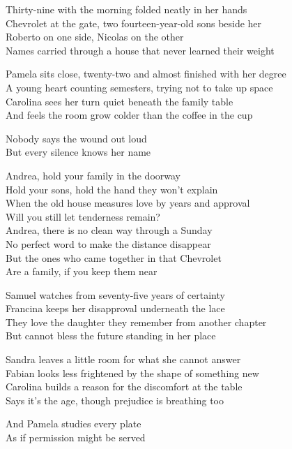 \begin{lyrics}
Thirty-nine with the morning folded neatly in her hands\\
Chevrolet at the gate, two fourteen-year-old sons beside her\\
Roberto on one side, Nicolas on the other\\
Names carried through a house that never learned their weight

Pamela sits close, twenty-two and almost finished with her degree\\
A young heart counting semesters, trying not to take up space\\
Carolina sees her turn quiet beneath the family table\\
And feels the room grow colder than the coffee in the cup

Nobody says the wound out loud\\
But every silence knows her name

Andrea, hold your family in the doorway\\
Hold your sons, hold the hand they won’t explain\\
When the old house measures love by years and approval\\
Will you still let tenderness remain?\\
Andrea, there is no clean way through a Sunday\\
No perfect word to make the distance disappear\\
But the ones who came together in that Chevrolet\\
Are a family, if you keep them near

Samuel watches from seventy-five years of certainty\\
Francina keeps her disapproval underneath the lace\\
They love the daughter they remember from another chapter\\
But cannot bless the future standing in her place

Sandra leaves a little room for what she cannot answer\\
Fabian looks less frightened by the shape of something new\\
Carolina builds a reason for the discomfort at the table\\
Says it’s the age, though prejudice is breathing too

And Pamela studies every plate\\
As if permission might be served


\end{lyrics}
